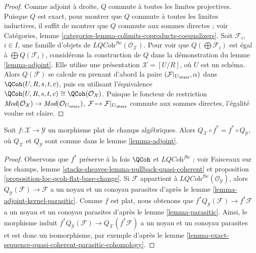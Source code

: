 \begin{proof}
\medskip\noindent
Comme adjoint à droite, $Q$ commute à toutes les limites projectives. Puisque $Q$ est exact, pour
montrer que $Q$ commute à toutes les limites inductives, il suffit de montrer que $Q$
commute aux sommes directes ; voir
Catégories, lemme \ref{categories-lemma-colimits-coproducts-coequalizers}.
Soit $\mathcal{F}_i$, $i \in I$, une famille d'objets de
$\textit{LQCoh}^{fbc}(\mathcal{O}_\mathcal{X})$. Pour voir que
$Q(\bigoplus \mathcal{F}_i)$ est égal à $\bigoplus Q(\mathcal{F}_i)$,
considérons la construction de $Q$ dans la démonstration du
lemme \ref{lemma-adjoint}. Elle utilise une présentation $\mathcal{X} = [U/R]$,
où $U$ est un schéma. Alors $Q(\mathcal{F})$
se calcule en prenant d'abord la paire
$(\mathcal{F}|_{U_\etale}, \alpha)$ dans $\QCoh(U, R, s, t, c)$,
puis en utilisant l'équivalence
$\QCoh(U, R, s, t, c) \cong \QCoh(\mathcal{O}_\mathcal{X})$.
Puisque le foncteur de restriction $\textit{Mod}(\mathcal{O}_\mathcal{X}) \to
\textit{Mod}(\mathcal{O}_{U_\etale})$,
$\mathcal{F} \mapsto \mathcal{F}|_{U_\etale}$ commute aux
sommes directes, l'égalité voulue est claire.
\end{proof}

\begin{lemma}
\label{lemma-flat-morphism-and-Q}
Soit $f : \mathcal{X} \to \mathcal{Y}$ un morphisme plat de champs algébriques.
Alors $Q_\mathcal{X} \circ f^* = f^* \circ Q_\mathcal{Y}$, où
$Q_\mathcal{X}$ et $Q_\mathcal{Y}$ sont comme dans le lemme \ref{lemma-adjoint}.
\end{lemma}

\begin{proof}
Observons que $f^*$ préserve à la fois $\QCoh$ et $\textit{LQCoh}^{fbc}$ ;
voir Faisceaux sur les champs, lemme
\ref{stacks-sheaves-lemma-pullback-quasi-coherent} et
proposition \ref{proposition-loc-qcoh-flat-base-change}.
Si $\mathcal{F}$ appartient à $\textit{LQCoh}^{fbc}(\mathcal{O}_\mathcal{Y})$,
alors $Q_\mathcal{Y}(\mathcal{F}) \to \mathcal{F}$
a un noyau et un conoyau parasites
d'après le lemme \ref{lemma-adjoint-kernel-parasitic}.
Comme $f$ est plat, nous obtenons que $f^*Q_\mathcal{Y}(\mathcal{F}) \to f^*\mathcal{F}$
a un noyau et un conoyau parasites d'après le
lemme \ref{lemma-parasitic}.
Ainsi, le morphisme induit
$f^*Q_\mathcal{Y}(\mathcal{F}) \to Q_\mathcal{X}(f^*\mathcal{F})$
a un noyau et un conoyau parasites et est donc un isomorphisme,
par exemple d'après le
lemme \ref{lemma-exact-sequence-quasi-coherent-parasitic-cohomology}.
\end{proof}

